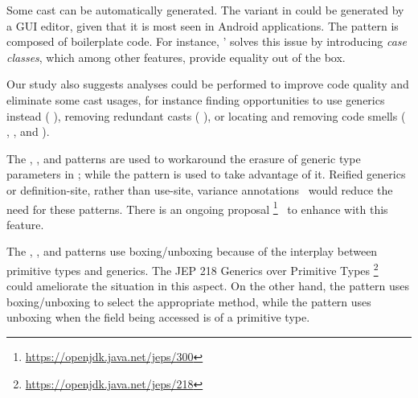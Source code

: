 Some cast can be automatically generated.
The  variant in  could be generated by a GUI editor,
given that it is most seen in Android applications.
The  pattern is composed of boilerplate code.
For instance, \scala{}' solves this issue by introducing \emph{case classes},
which among other features, provide equality out of the box.

Our study also suggests analyses could be performed to improve code quality and eliminate some cast usages,
for instance finding opportunities to use generics instead (\cf{} ),
removing redundant casts (\cf{} ),
or locating and removing code smells (\cf{}
,
, and
).

The
,
, and
patterns are used to workaround the erasure of generic type parameters in \java{};
while the  pattern is used to take advantage of it.
Reified generics or definition-site, rather than use-site,
variance annotations~\citep{altidorTamingWildcardsCombining2011}
would reduce the need for these patterns.
There is an ongoing proposal%
\footnote{\url{https://openjdk.java.net/jeps/300}}~\citep{jep300}
to enhance \java{} with this feature.

The
,
, and
patterns use boxing/unboxing because of the interplay between primitive types and generics.
The JEP 218 Generics over Primitive Types%
\footnote{\url{https://openjdk.java.net/jeps/218}}~\citep{jep218}
could ameliorate the situation in this aspect.
On the other hand, 
the  pattern uses boxing/unboxing to select the appropriate method,
while the  pattern
uses unboxing when the field being accessed is of a primitive type.
